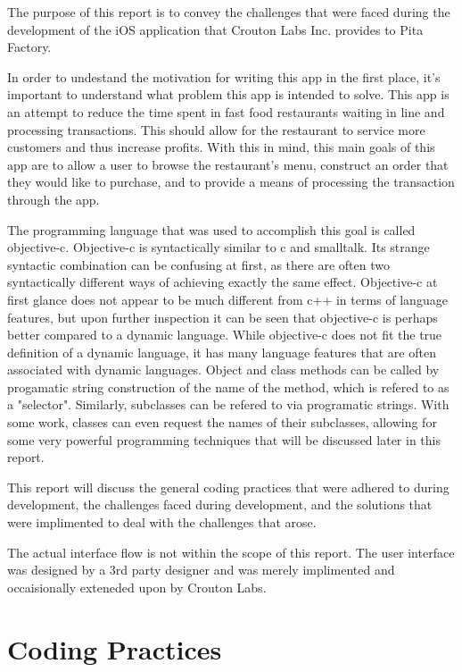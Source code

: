 \documentclass[se]{uw-wkrpt}
\begin{document}
The purpose of this report is to convey the challenges that were faced
during the development of the iOS application that Crouton Labs Inc. 
provides to Pita Factory.

In order to undestand the motivation for writing this app in the first
place, it's important to understand what problem this app is intended
to solve. This app is an attempt to reduce the time spent in fast food restaurants
waiting in line and processing transactions. This should allow for the restaurant
to service more customers and thus increase profits. With this in mind,
this main goals of this app are to allow a user to browse the restaurant's
menu, construct an order that they would like to purchase, and to provide
a means of processing the transaction through the app.

The programming language that was used to accomplish this goal is called
objective-c. Objective-c is syntactically similar to c and smalltalk. Its strange
syntactic combination can be confusing at first, as there are often two
syntactically different ways of achieving exactly the same effect. Objective-c
at first glance does not appear to be much different from c++ in terms
of language features, but upon further inspection it can be seen that 
objective-c is perhaps better compared to a dynamic language. While objective-c
does not fit the true definition of a dynamic language, it has many 
language features that are often associated with dynamic languages. 
Object and class methods can be called by progamatic string construction
of the name of the method, which is refered to as a "selector".
Similarly, subclasses can be refered to via programatic strings. With some work,
classes can even request the names of their subclasses, allowing for
some very powerful programming techniques that will be discussed later in
this report.

This report will discuss the general coding practices that were adhered to
during development, the challenges faced during development, and the solutions
that were implimented to deal with the challenges that arose.

The actual interface flow is not within the scope of this report.
The user interface was designed by a 3rd party designer and was merely
implimented and occaisionally exteneded upon by Crouton Labs.

\section{Coding Practices}
\end{document}

